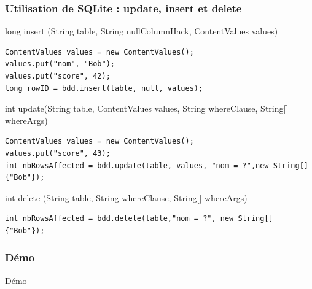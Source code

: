 \documentclass{beamer}
\begin{document}
\begin{frame}[fragile]
\frametitle{Utilisation de SQLite : update, insert et delete}
long insert (String table, String nullColumnHack, ContentValues values)
\begin{lstlisting}
ContentValues values = new ContentValues();
values.put("nom", "Bob");
values.put("score", 42);
long rowID = bdd.insert(table, null, values);
\end{lstlisting}
int update(String table, ContentValues values, String whereClause, String[] whereArgs)
\begin{lstlisting}
ContentValues values = new ContentValues();
values.put("score", 43);
int nbRowsAffected = bdd.update(table, values, "nom = ?",new String[] {"Bob"});
\end{lstlisting}
int delete (String table, String whereClause, String[] whereArgs)
\begin{lstlisting}
int nbRowsAffected = bdd.delete(table,"nom = ?", new String[] {"Bob"});
\end{lstlisting}
\end{frame}
\begin{frame}[fragile]
\frametitle{Démo}
Démo
\end{frame}
\end{document}
